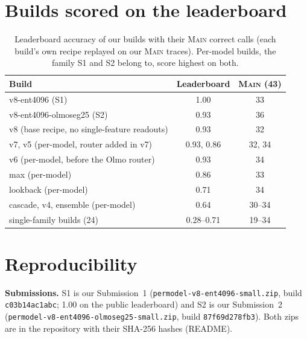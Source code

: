 \documentclass{article}
\newcommand{\sone}{\textsc{S1}}
\newcommand{\stwo}{\textsc{S2}}
\begin{document}
\clearpage
\section{Builds scored on the leaderboard}
\label{app:ranking}
\begin{table}[H]
\centering\small
\caption{Leaderboard accuracy of our builds with their \textsc{Main} correct calls (each build's own recipe replayed on our \textsc{Main} traces). Per-model builds, the family \sone{} and \stwo{} belong to, score highest on both.}
\begin{tabular}{lcc}
\toprule
Build & Leaderboard & \textsc{Main} (43) \\
\midrule
v8-ent4096 (\sone{}) & 1.00 & 33 \\
v8-ent4096-olmoseg25 (\stwo{}) & 0.93 & 36 \\
v8 (base recipe, no single-feature readouts) & 0.93 & 32 \\
v7, v5 (per-model, router added in v7) & 0.93, 0.86 & 32, 34 \\
v6 (per-model, before the Olmo router) & 0.93 & 34 \\
max (per-model) & 0.86 & 33 \\
lookback (per-model) & 0.71 & 34 \\
cascade, v4, ensemble (per-model) & 0.64 & 30--34 \\
single-family builds (24) & 0.28--0.71 & 19--34 \\
\bottomrule
\end{tabular}
\end{table}

\section{Reproducibility}
\label{app:repro}
\textbf{Submissions.} \sone{} is our Submission~1 (\texttt{permodel-v8-ent4096-small.zip}, build \texttt{c03b14ac1abc}; 1.00 on the public leaderboard) and \stwo{} is our Submission~2 (\texttt{permodel-v8-ent4096-olmoseg25-small.zip}, build \texttt{87f69d278fb3}). Both zips are in the repository with their SHA-256 hashes (README).
\end{document}
